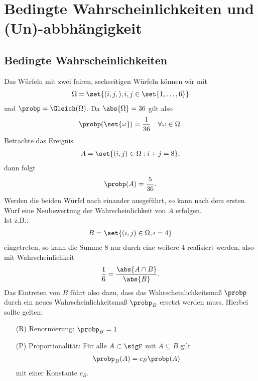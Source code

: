 \chapter{Bedingte Wahrscheinlichkeiten und (Un)-abbhängigkeit}

\section{Bedingte Wahrscheinlichkeiten}
\begin{example}
	Das Würfeln mit zwei fairen, sechseitigen Würfeln können wir mit 
	\begin{align}
		\Omega = \set{(i,j,), i,j \in \set{1,\dots,6}}\notag
	\end{align}
	und $\probp = \Gleich(\Omega)$. Da $\abs{\Omega} = 36$ gilt also
	\begin{align}
		\probp(\set{\omega}) = \frac{1}{36} \quad \forall \omega \in \Omega.\notag
	\end{align}
	Betrachte das Ereignis
	\begin{align}
		A = \set{(i,j) \in \Omega : i + j = 8},\notag
	\end{align}
	dann folgt
	\begin{align}
		\probp(A) = \frac{5}{36}.\notag
	\end{align}
	Werden die beiden Würfel nach einander ausgeführt, so kann nach dem ersten Wurf eine Neubewertung der Wahrscheinlichkeit von $A$ erfolgen.\\
	Ist z.B.:
	\begin{align}
		B = \set{(i,j) \in \Omega, i = 4}\notag
	\end{align}
	eingetreten, so kann die Summe 8 nur durch eine weitere 4 realisiert werden, also mit Wahrscheinlichkeit
	\begin{align}
		\frac{1}{6} = \frac{\abs{A \cap B}}{\abs{B}}.\notag 
	\end{align}
	Das Eintreten von $B$ führt also dazu, dass das Wahrscheinlichkeitsmaß $\probp$ durch ein neues Wahrscheinlichkeitsmaß $\probp_{B}$ ersetzt werden muss. Hierbei sollte gelten:
	\begin{enumerate} %
		\item[(R)] Renormierung: $\probp_{B} = 1$ 
		\item[(P)] Proportionalität: Für alle $A \subset \sigF$ mit $A \subseteq B$ gilt
		\begin{align}
			\probp_{B}(A) = c_B \probp(A)\notag
		\end{align}
		mit einer Konstante $c_B$. 
	\end{enumerate}
\end{example}

